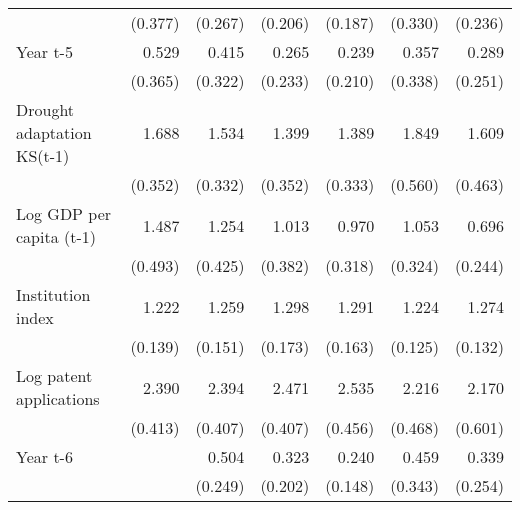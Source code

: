 \begin{table}[htbp]
\begin{tabular}{l*{6}{D{.}{.}{-1}}}
                    &     (0.377)         &     (0.267)         &     (0.206)         &     (0.187)         &     (0.330)         &     (0.236)         \\
\addlinespace
Year t-5            &       0.529         &       0.415         &       0.265\sym{\%}  &       0.239\sym{\%}  &       0.357         &       0.289         \\
                    &     (0.365)         &     (0.322)         &     (0.233)         &     (0.210)         &     (0.338)         &     (0.251)         \\
\addlinespace
Drought adaptation KS(t-1)&       1.688\sym{**} &       1.534\sym{**} &       1.399         &       1.389         &       1.849\sym{**} &       1.609\sym{*}  \\
                    &     (0.352)         &     (0.332)         &     (0.352)         &     (0.333)         &     (0.560)         &     (0.463)         \\
\addlinespace
Log GDP per capita (t-1)&       1.487         &       1.254         &       1.013         &       0.970         &       1.053         &       0.696         \\
                    &     (0.493)         &     (0.425)         &     (0.382)         &     (0.318)         &     (0.324)         &     (0.244)         \\
\addlinespace
Institution index   &       1.222\sym{*}  &       1.259\sym{*}  &       1.298\sym{*}  &       1.291\sym{**} &       1.224\sym{**} &       1.274\sym{**} \\
                    &     (0.139)         &     (0.151)         &     (0.173)         &     (0.163)         &     (0.125)         &     (0.132)         \\
\addlinespace
Log patent applications&       2.390\sym{***}&       2.394\sym{***}&       2.471\sym{***}&       2.535\sym{***}&       2.216\sym{***}&       2.170\sym{***}\\
                    &     (0.413)         &     (0.407)         &     (0.407)         &     (0.456)         &     (0.468)         &     (0.601)         \\
\addlinespace
Year t-6            &                     &       0.504         &       0.323\sym{*}  &       0.240\sym{**} &       0.459         &       0.339\sym{\%}  \\
                    &                     &     (0.249)         &     (0.202)         &     (0.148)         &     (0.343)         &     (0.254)         \\

\end{tabular}
\end{table}
